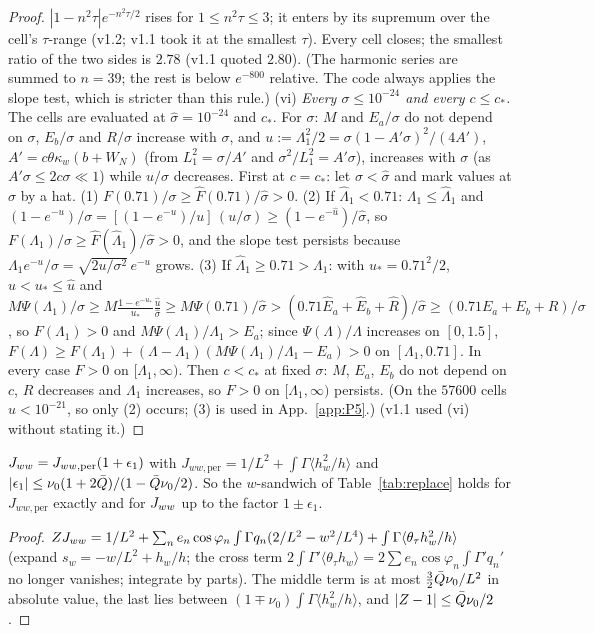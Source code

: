 \begin{proof}
$|1-n^2\tau|e^{-n^2\tau/2}$ rises for $1\le n^2\tau\le3$; it enters by its supremum over the cell's $\tau$-range (v1.2; v1.1 took it at the smallest
$\tau$). Every cell closes; the smallest ratio of the two sides is $2.78$ (v1.1 quoted $2.80$). (The harmonic series are summed to $n=39$; the rest is
below $e^{-800}$ relative. The code always applies the slope test, which is stricter than this rule.)
(vi) \emph{Every $\sigma\le10^{-24}$ and every $c\le c_*$.} The cells are evaluated at $\hat\sigma=10^{-24}$ and $c_*$. For $\sigma$: $M$ and $E_a/\sigma$ do not depend on $\sigma$, $E_b/\sigma$ and $R/\sigma$ increase with $\sigma$, and
$u:=\Lambda_1^2/2=\sigma(1-A'\sigma)^2/(4A')$, $A'=c\theta\kappa_w(b+W_N)$ (from $L_1^2=\sigma/A'$ and $\sigma^2/L_1^2=A'\sigma$), increases with $\sigma$ (as $A'\sigma\le2c\sigma\ll1$) while $u/\sigma$ decreases.
First at $c=c_*$: let $\sigma<\hat\sigma$ and mark
values at $\hat\sigma$ by a hat. (1) $F(0.71)/\sigma\ge\hat F(0.71)/\hat\sigma>0$. (2) If $\hat\Lambda_1<0.71$: $\Lambda_1\le\hat\Lambda_1$ and
$(1-e^{-u})/\sigma=[(1-e^{-u})/u]\,(u/\sigma)\ge(1-e^{-\hat u})/\hat\sigma$, so $F(\Lambda_1)/\sigma\ge\hat F(\hat\Lambda_1)/\hat\sigma>0$, and the slope test persists
because $\Lambda_1e^{-u}/\sigma=\sqrt{2u/\sigma^2}\,e^{-u}$ grows. (3) If $\hat\Lambda_1\ge0.71>\Lambda_1$: with $u_*=0.71^2/2$, $u<u_*\le\hat u$ and
$M\Psi(\Lambda_1)/\sigma\ge M\frac{1-e^{-u_*}}{u_*}\frac{\hat u}{\hat\sigma}\ge M\Psi(0.71)/\hat\sigma>(0.71\hat E_a+\hat E_b+\hat R)/\hat\sigma\ge(0.71E_a+E_b+R)/\sigma$,
so $F(\Lambda_1)>0$ and $M\Psi(\Lambda_1)/\Lambda_1>E_a$; since $\Psi(\Lambda)/\Lambda$ increases on $[0,1.5]$,
$F(\Lambda)\ge F(\Lambda_1)+(\Lambda-\Lambda_1)(M\Psi(\Lambda_1)/\Lambda_1-E_a)>0$ on $[\Lambda_1,0.71]$. In every case $F>0$ on $[\Lambda_1,\infty)$. Then $c<c_*$ at fixed $\sigma$: $M$, $E_a$, $E_b$ do not depend
on $c$, $R$ decreases and $\Lambda_1$ increases, so $F>0$ on $[\Lambda_1,\infty)$ persists.
(On the $57600$ cells $\hat u<10^{-21}$, so only (2) occurs; (3) is used in App.~\ref{app:P5}.) (v1.1 used (vi) without stating it.)
\end{proof}

\begin{lemma}[$w$-information] \proofst
\label{lem:BL1}
$J_{ww}=J_{ww,\mathrm{per}}(1+\epsilon_1)$ with $J_{ww,\mathrm{per}}=1/L^2+\int\Gamma\langle h_w^2/h\rangle$ and $|\epsilon_1|\le\nu_0(1+2\bar Q)/(1-\bar Q\nu_0/2)$.
So the $w$-sandwich of Table~\ref{tab:replace} holds for $J_{ww,\mathrm{per}}$ exactly and for $J_{ww}$ up to the factor $1\pm\epsilon_1$.
\end{lemma}
\begin{proof}
$ZJ_{ww}=1/L^2+\sum_ne_n\cos\varphi_n\int\Gamma q_n(2/L^2-w^2/L^4)+\int\Gamma\langle\theta_\tau h_w^2/h\rangle$ (expand $s_w=-w/L^2+h_w/h$; the cross term
$2\int\Gamma'\langle\theta_\tau h_w\rangle=2\sum e_n\cos\varphi_n\int\Gamma'q_n'$ no longer vanishes; integrate by parts). The middle term is at most
$\tfrac32\bar Q\nu_0/L^2$ in absolute value, the last lies between $(1\mp\nu_0)\int\Gamma\langle h_w^2/h\rangle$, and $|Z-1|\le\bar Q\nu_0/2$.
\end{proof}

